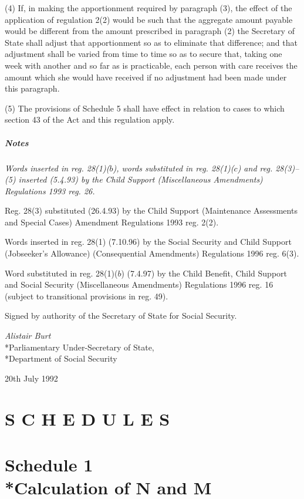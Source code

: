 \documentclass[a4paper]{article}
\newcommand\amendment[1]{\subsubsection*{Notes}{\itshape\frenchspacing\footnotesize #1 \par\goodbreak}}
\begin{document}
(4) If, in making the apportionment required by paragraph (3), the effect of the application of regulation 2(2) would be such that the aggregate amount payable would be different from the amount prescribed in paragraph (2) the Secretary of State shall adjust that apportionment so as to eliminate that difference; and that adjustment shall be varied from time to time so as to secure that, taking one week with another and so far as is practicable, each person with care receives the amount which she would have received if no adjustment had been made under this paragraph.

(5) The provisions of Schedule 5 shall have effect in relation to cases to which section 43 of the Act and this regulation apply.

\amendment{
Words inserted in reg. 28(1)($b$), words substituted in reg. 28(1)($c$) and reg. 28(3)--(5) inserted (5.4.93) by the Child Support (Miscellaneous Amendments) Regulations 1993 reg. 26.

Reg. 28(3) substituted (26.4.93) by the Child Support (Maintenance Assessments and Special Cases) Amendment Regulations 1993 reg. 2(2).

Words inserted in reg. 28(1) (7.10.96) by the Social Security and Child Support (Jobseeker's Allowance) (Consequential Amendments) Regulations 1996 reg. 6(3).

Word substituted in reg. 28(1)($b$) (7.4.97) by the Child Benefit, Child Support and Social Security (Miscellaneous Amendments) Regulations 1996 reg. 16 (subject to transitional provisions in reg. 49).
}

\bigskip

Signed by authority of the Secretary of State for Social Security.

{\raggedleft
\emph{Alistair Burt}\\*Parliamentary Under-Secretary of State,\\*Department of Social Security

}

20th July 1992

\clearpage

\part*{S C H E D U L E S}

\part[Schedule 1 --- Calculation of N and M]{Schedule 1\\*Calculation of N and M}
\end{document}
